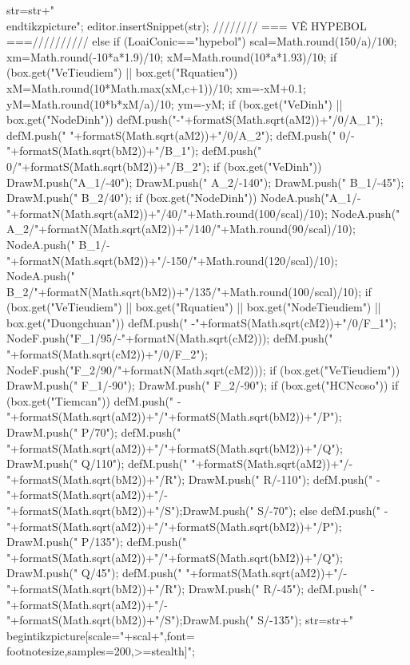 {{{{{				}
			}
			str=str+"\n\\end{tikzpicture}";
			editor.insertSnippet(str);
		}
		//////// === VẼ HYPEBOL ===//////////
		else if (LoaiConic=="hypebol") {
			scal=Math.round(150/a)/100;
			xm=Math.round(-10*a*1.9)/10;
			xM=Math.round(10*a*1.93)/10;
			if (box.get("VeTieudiem") || box.get("Rquatieu")) {
				xM=Math.round(10*Math.max(xM,c+1))/10;  xm=-xM+0.1;
			}
			yM=Math.round(10*b*xM/a)/10; 			ym=-yM;
			if (box.get("VeDinh") || box.get("NodeDinh")) {
				defM.push("{-"+formatS(Math.sqrt(aM2))+"}/0/A_1");		defM.push(" {"+formatS(Math.sqrt(aM2))+"}/0/A_2");
				defM.push(" 0/{-"+formatS(Math.sqrt(bM2))+"}/B_1");		defM.push(" 0/{"+formatS(Math.sqrt(bM2))+"}/B_2");
				if (box.get("VeDinh")) {
					DrawM.push("A_1/-40");		DrawM.push(" A_2/-140");
					DrawM.push(" B_1/-45");		DrawM.push(" B_2/40");
				}
				if (box.get("NodeDinh")) {
					NodeA.push("A_1/-"+formatN(Math.sqrt(aM2))+"/40/"+Math.round(100/scal)/10);		NodeA.push(" A_2/"+formatN(Math.sqrt(aM2))+"/140/"+Math.round(90/scal)/10);
					NodeA.push(" B_1/-"+formatN(Math.sqrt(bM2))+"/-150/"+Math.round(120/scal)/10);	NodeA.push(" B_2/"+formatN(Math.sqrt(bM2))+"/135/"+Math.round(100/scal)/10);
				}
			}
			if (box.get("VeTieudiem") || box.get("Rquatieu") || box.get("NodeTieudiem") || box.get("Duongchuan")) {
				defM.push(" {-"+formatS(Math.sqrt(cM2))+"}/0/F_1");		NodeF.push("F_1/95/-"+formatN(Math.sqrt(cM2)));
				defM.push(" {"+formatS(Math.sqrt(cM2))+"}/0/F_2");		NodeF.push("F_2/90/"+formatN(Math.sqrt(cM2)));
				if (box.get("VeTieudiem")){
					DrawM.push(" F_1/-90");	DrawM.push(" F_2/-90");
				}
			}
			if (box.get("HCNcoso")) {
				if (box.get("Tiemcan")) {
					defM.push(" {-"+formatS(Math.sqrt(aM2))+"}/{"+formatS(Math.sqrt(bM2))+"}/P");	DrawM.push(" P/70");
					defM.push(" {"+formatS(Math.sqrt(aM2))+"}/{"+formatS(Math.sqrt(bM2))+"}/Q");	DrawM.push(" Q/110");
					defM.push(" {"+formatS(Math.sqrt(aM2))+"}/{-"+formatS(Math.sqrt(bM2))+"}/R");	DrawM.push(" R/-110");
					defM.push(" {-"+formatS(Math.sqrt(aM2))+"}/{-"+formatS(Math.sqrt(bM2))+"}/S");DrawM.push(" S/-70");
				}
				else {
					defM.push(" {-"+formatS(Math.sqrt(aM2))+"}/{"+formatS(Math.sqrt(bM2))+"}/P");	DrawM.push(" P/135");
					defM.push(" {"+formatS(Math.sqrt(aM2))+"}/{"+formatS(Math.sqrt(bM2))+"}/Q");	DrawM.push(" Q/45");
					defM.push(" {"+formatS(Math.sqrt(aM2))+"}/{-"+formatS(Math.sqrt(bM2))+"}/R");	DrawM.push(" R/-45");
					defM.push(" {-"+formatS(Math.sqrt(aM2))+"}/{-"+formatS(Math.sqrt(bM2))+"}/S");DrawM.push(" S/-135");
				}
			}
			str=str+"\\begin{tikzpicture}[scale="+scal+",font=\\footnotesize,samples=200,>=stealth]";
}}}
